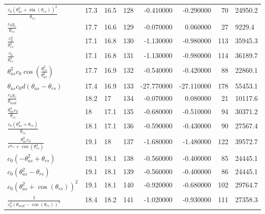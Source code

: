 \begin{tabularx}{\textwidth}{lllrrrrl}
$ \displaystyle\frac{c_{0} \left(\theta_{as}^{2} + \sin{\left(\theta_{rs} \right)}\right)^{2}}{\theta_{rs}} $  &  17.3  &  16.5  &  128  &  -0.410000  &  -0.290000  &  70  &  24950.2  \\ 
$ \displaystyle\frac{c_{0} y_c}{\theta_{rs}} $  &  17.7  &  16.6  &  129  &  -0.070000  &  0.060000  &  27  &  9229.4  \\ 
$ \displaystyle\frac{c_{0}^{4}}{\theta_{rs}^{4}} $  &  17.1  &  16.8  &  130  &  -1.130000  &  -0.980000  &  113  &  35945.3  \\ 
$ \displaystyle\frac{c_{0}}{\theta_{rs}^{4}} $  &  17.1  &  16.8  &  131  &  -1.130000  &  -0.980000  &  114  &  36189.7  \\ 
$ \theta_{as}^{2} c_{0} \cos{\left(\displaystyle\frac{\theta_{rs}^{2}}{\theta_{as}^{2}} \right)} $  &  17.7  &  16.9  &  132  &  -0.540000  &  -0.420000  &  88  &  22860.1  \\ 
$ \theta_{as} c_{0} d \left(\theta_{as} - \theta_{rs}\right) $  &  17.4  &  16.9  &  133  &  -27.770000  &  -27.110000  &  178  &  55453.1  \\ 
$ \displaystyle\frac{c_{0} y_c}{\theta_{mid}} $  &  18.2  &  17\phantom{.0}  &  134  &  -0.070000  &  0.080000  &  21  &  10117.6  \\ 
$ \displaystyle\frac{\theta_{as}^{4} c_{0}}{\theta_{rs}} $  &  18\phantom{.0}  &  17.1  &  135  &  -0.680000  &  -0.510000  &  94  &  30371.2  \\ 
$ \displaystyle\frac{c_{0} \left(\theta_{as}^{4} + \theta_{rs}\right)}{\theta_{rs}} $  &  18.1  &  17.1  &  136  &  -0.590000  &  -0.430000  &  90  &  27567.4  \\ 
$ \displaystyle\frac{\theta_{as}^{3} c_{0}}{e^{\theta_{rs}} + \cos{\left(\theta_{rs}^{4} \right)}} $  &  19.1  &  18\phantom{.0}  &  137  &  -1.680000  &  -1.480000  &  122  &  39572.7  \\ 
$ c_{0} \left(- \theta_{as}^{2} + \theta_{rs}\right) $  &  19.1  &  18.1  &  138  &  -0.560000  &  -0.400000  &  85  &  24445.1  \\ 
$ c_{0} \left(\theta_{as}^{2} - \theta_{rs}\right) $  &  19.1  &  18.1  &  139  &  -0.560000  &  -0.400000  &  86  &  24445.1  \\ 
$ c_{0} \left(\theta_{as}^{2} + \cos{\left(\theta_{rs} \right)}\right)^{2} $  &  19.1  &  18.1  &  140  &  -0.920000  &  -0.680000  &  102  &  29764.7  \\ 
$ \displaystyle\frac{1}{c_{0}^{2} \left(\theta_{mid} - \cos{\left(\theta_{rs} \right)}\right)^{2}} $  &  18.4  &  18.2  &  141  &  -1.020000  &  -0.930000  &  111  &  27358.3  \\ 

\end{tabularx}
